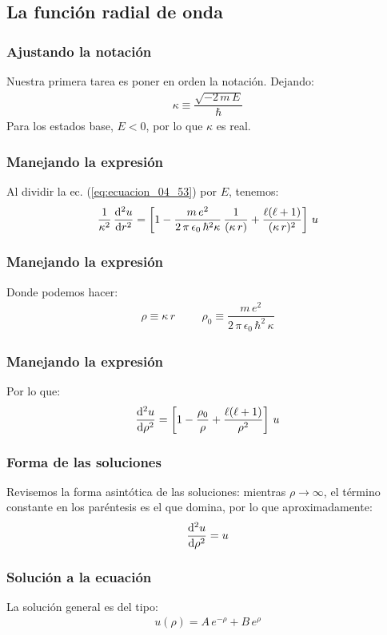 \documentclass[12pt]{beamer}
\begin{document}
\subsection{La función radial de onda}

\begin{frame}
\frametitle{Ajustando la notación}
Nuestra primera tarea es poner en orden la notación. Dejando:
\pause
\begin{align}
\kappa \equiv \dfrac{\sqrt{-2 \, m \, E}}{\hbar}
\label{eq:ecuacion_04_54}
\end{align}
Para los estados base, $E < 0$, por lo que $\kappa$ es real.
\end{frame}
\begin{frame}
\frametitle{Manejando la expresión}
Al dividir la ec. (\ref{eq:ecuacion_04_53}) por $E$, tenemos:
\pause
\begin{align*}
\dfrac{1}{\kappa^{2}} \, \dv[2]{u}{r} = \left[1 - \dfrac{m \, e^{2}}{2 \, \pi \, \epsilon_{0} \,\hbar^{2} \kappa} \, \dfrac{1}{(\kappa \, r)} + \dfrac{\ell (\ell + 1)}{(\kappa \, r)^{2}} \right] \, u
\end{align*}
\end{frame}
\begin{frame}
\frametitle{Manejando la expresión}
Donde podemos hacer:
\pause
\begin{align}
\rho \equiv \kappa \, r \hspace{1cm} \rho_{0} \equiv \dfrac{m \, e^{2}}{2 \, \pi \, \epsilon_{0} \, \hbar^{2} \, \kappa}
\label{eq:ecuacion_04_55}
\end{align}
\end{frame}
\begin{frame}
\frametitle{Manejando la expresión}
Por lo que:
\pause
\begin{align}
\dv[2]{u}{\rho} = \left[ 1 - \dfrac{\rho_{0}}{\rho} + \dfrac{\ell (\ell + 1)}{\rho^{2}} \right] \, u
\label{eq:ecuacion_04_56}
\end{align}
\end{frame}
\begin{frame}
\frametitle{Forma de las soluciones}
Revisemos la forma asintótica de las soluciones: mientras $\rho \to \infty$, el término constante en los paréntesis es el que domina, por lo que aproximadamente:
\pause
\begin{align*}
\dv[2]{u}{\rho} = u
\end{align*}
\end{frame}
\begin{frame}
\frametitle{Solución a la ecuación}
La solución general es del tipo:
\pause
\begin{align}
u (\rho) = A \, e^{-\rho} + B \, e^{\rho}
\label{eq:ecuacion_04_57}
\end{align}
\end{frame}
\end{document}
